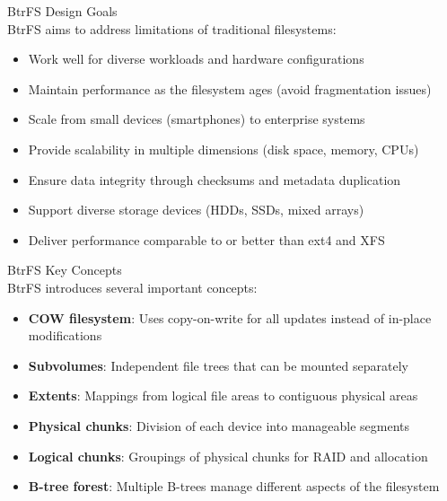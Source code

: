 \begin{definition}{BtrFS Design Goals}\\
    BtrFS aims to address limitations of traditional filesystems:
    \begin{itemize}
        \item Work well for diverse workloads and hardware configurations
        \item Maintain performance as the filesystem ages (avoid fragmentation issues)
        \item Scale from small devices (smartphones) to enterprise systems
        \item Provide scalability in multiple dimensions (disk space, memory, CPUs)
        \item Ensure data integrity through checksums and metadata duplication
        \item Support diverse storage devices (HDDs, SSDs, mixed arrays)
        \item Deliver performance comparable to or better than ext4 and XFS
    \end{itemize}
\end{definition}

\begin{definition}{BtrFS Key Concepts}\\
    BtrFS introduces several important concepts:
    \begin{itemize}
        \item \textbf{COW filesystem}: Uses copy-on-write for all updates instead of in-place modifications
        \item \textbf{Subvolumes}: Independent file trees that can be mounted separately
        \item \textbf{Extents}: Mappings from logical file areas to contiguous physical areas
        \item \textbf{Physical chunks}: Division of each device into manageable segments
        \item \textbf{Logical chunks}: Groupings of physical chunks for RAID and allocation
        \item \textbf{B-tree forest}: Multiple B-trees manage different aspects of the filesystem
    \end{itemize}
\end{definition}

